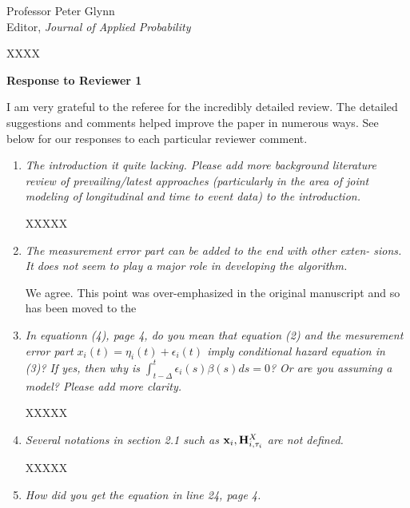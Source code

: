 \documentclass[11pt]{letter} %
\begin{document}
\begin{letter}{Professor
	Peter Glynn\\
	Editor, {\em Journal of Applied Probability}}
\begin{enumerate}
\vspace{5mm}
XXXX
\vspace{5mm}

\end{enumerate}

\newpage
{\bf Response to Reviewer 1}
\vspace{5mm}

I am very grateful to the referee for the incredibly detailed review.  The detailed suggestions and comments helped improve the paper in numerous ways.  See below for our responses to each particular reviewer comment.

\begin{enumerate}
\item {\it The introduction it quite lacking. Please add more background literature review of prevailing/latest approaches (particularly in the area of joint modeling of longitudinal and time to event data) to the introduction.}

\vspace{5mm}
XXXXX
\vspace{5mm}

\item {\it The measurement error part can be added to the end with other exten-
sions. It does not seem to play a major role in developing the algorithm.}

\vspace{5mm}
We agree.  This point was over-emphasized in the original manuscript and so has been moved to the
\vspace{5mm}

\item {\it In equationn (4), page 4, do you mean that equation (2) and the mesurement error part $x_i (t) = \eta_i (t) + \epsilon_i (t)$ imply conditional hazard equation in (3)?  If yes, then why is $\int_{t-\Delta}^t \epsilon_i (s) \beta(s) ds = 0$?  Or are you assuming a model?  Please add more clarity.}

\vspace{5mm}
XXXXX
\vspace{5mm}

\item {\it Several notations in section 2.1 such as ${\bf x}_i, {\bf H}_{i,\tau_i}^X$ are not defined.}

\vspace{5mm}
XXXXX
\vspace{5mm}

\item {\it How did you get the equation in line 24, page 4.}


\end{enumerate}
\end{letter}
\end{document}
